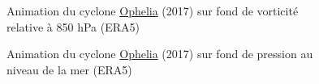 \documentclass[aspectratio=169, usepdftitle=false, xcolor={dvipsnames}, 9pt,table]{beamer}
\begin{document}
\begin{frame}[c]
\begin{columns}
\begin{column}{0.66\textwidth}
\begin{columns}[t]
\begin{column}{0.45\textwidth}
                \end{column}
            \end{columns}
        \end{column}
        \begin{column}{0.33\textwidth}
            \captionsetup{width=4cm}
            \vspace{-3em}
            \begin{figure}[h]
                \centering 
                \caption{Animation du cyclone \href{run:../Figures/Ophelia/vo850/ophelia-vo850.gif}{Ophelia} (2017) sur fond de \alert{vorticité relative à 850 hPa} (ERA5)}
            \end{figure}
            \begin{figure}
                \centering
                \caption{Animation du cyclone \href{run:../Figures/Ophelia/msl/ophelia-msl.gif}{Ophelia} (2017) sur fond de \alert{pression au niveau de la mer} (ERA5)}
            \end{figure}
        \end{column}
    \end{columns}
\end{frame}
\end{document}
